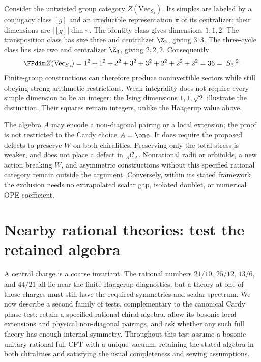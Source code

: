 \begin{example}
Consider the untwisted group category $Z(\mathrm{Vec}_{S_3})$.
Its simples are labeled by a conjugacy class $[g]$ and an irreducible
representation $\pi$ of its centralizer; their dimensions are
$|[g]|\dim\pi$. The identity class gives dimensions $1,1,2$.
The transposition class has size three and centralizer $\Z_2$,
giving $3,3$. The three-cycle class has size two and centralizer
$\Z_3$, giving $2,2,2$. Consequently
\[
 \FPdim Z(\mathrm{Vec}_{S_3})
 =1^2+1^2+2^2+3^2+3^2+2^2+2^2+2^2=36=|S_3|^2.
\]
Finite-group constructions can therefore produce noninvertible
sectors while still obeying strong arithmetic restrictions. Weak
integrality does not require every simple dimension to be an integer:
the Ising dimensions $1,1,\sqrt2$ illustrate the distinction. Their
squares remain integers, unlike the Haagerup value above.
\end{example}

The algebra $A$ may encode a non-diagonal pairing or a local extension;
the proof is not restricted to the Cardy choice $A=\one$. It does
require the proposed defects to preserve $W$ on both chiralities.
Preserving only the total stress is weaker, and does not place a
defect in ${}_A\mathcal C_A$. Nonrational radii or orbifolds, a new
action breaking $W$, and asymmetric constructions without this
specified rational category remain outside the argument. Conversely,
within its stated framework the exclusion needs no extrapolated scalar
gap, isolated doublet, or numerical OPE coefficient.

\section{Nearby rational theories: test the retained algebra}

A central charge is a coarse invariant. The rational numbers
$21/10$, $25/12$, $13/6$, and $44/21$ all lie near the finite
Haagerup diagnostics, but a theory at one of those charges must
still have the required symmetries and scalar spectrum. We now
describe a second family of tests, complementary to the canonical
Cardy phase test: retain a specified rational chiral algebra, allow
its bosonic local extensions and physical non-diagonal pairings,
and ask whether any such full theory has enough internal symmetry.
Throughout this test assume a bosonic unitary rational full CFT with
a unique vacuum, retaining the stated algebra in both chiralities
and satisfying the usual completeness and sewing assumptions.


